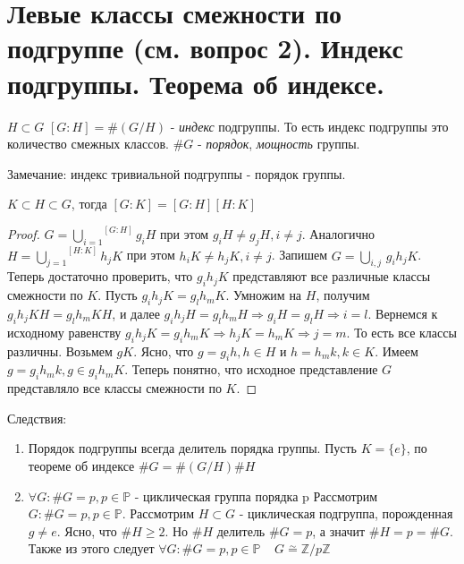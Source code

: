 \section{Левые классы смежности по подгруппе (см. вопрос 2). Индекс подгруппы. Теорема об индексе.}

\begin{defn}
  $ H \subset G $ \newline
  $ [G:H] = \#(G/H) $ - \emph{индекс} подгруппы. То есть индекс подгруппы это количество смежных классов. \newline
  $ \#G $ - \emph{порядок}, \emph{мощность} группы. 
\end{defn}

Замечание: индекс тривиальной подгруппы - порядок группы.

\begin{thm}
  $ K \subset H \subset G $, \newline тогда $ [G:K] = [G:H][H:K] $
\end{thm}
\begin{proof}
  $ G = \overset{[G:H]}{\underset{i=1}{\bigcup}} g_{i}H $ при этом $ g_{i}H \ne g_{j}H, i \ne j $. 
  Аналогично $ H = \overset{[H:K]}{\underset{j=1}\bigcup} h_{j}K $ при этом $ h_{i}K \ne h_{j}K, i \ne j $. 
  Запишем $ G = \underset{i, j}\bigcup \, g_{i}h_{j}K $. \newline
  Теперь достаточно проверить, что $ g_{i}h_{j}K $ представляют все различные классы смежности по $ K $.
  Пусть $ g_{i}h_{j}K = g_{l}h_{m}K $. Умножим на $ H $, получим $ g_{i}h_{j}KH = g_{l}h_{m}KH $, и далее
  $ g_{i}h_{j}H = g_{l}h_{m}H \Rightarrow  g_{i}H = g_{l}H \Rightarrow i = l $. Вернемся к исходному равенству
  $ g_{i}h_{j}K = g_{i}h_{m}K \Rightarrow h_{j}K = h_{m}K \Rightarrow j = m $. То есть все классы различны. \newline
  Возьмем $ gK $. Ясно, что $ g = g_{i}h, h \in H $ и $ h = h_{m}k, k \in K $. Имеем 
  $ g = g_{i}h_{m}k, g \in g_{i}h_{m}K $. Теперь понятно, что исходное представление $ G $ представляло все классы
  смежности по $ K $.
\end{proof}

Следствия:

\begin{enumerate}
  \item Порядок подгруппы всегда делитель порядка группы. \newline
    Пусть $ K = \{e\} $, по теореме об индексе $ \#G = \#(G/H)\#H $
  \item $ \forall G : \#G = p, p \in \mathbb{P} $ - циклическая группа порядка p \newline
    Рассмотрим $ G : \#G = p, p \in \mathbb{P} $. Рассмотрим $ H \subset G $ - циклическая подгруппа,
    порожденная $ g \ne e $. Ясно, что $ \#H \ge 2 $. Но $ \#H $ делитель $ \#G = p $, а значит
    $ \#H = p = \# G $. Также из этого следует $ \forall G : \#G = p, p \in \mathbb{P} \;\;\;\; 
    G \overset\sim{=} \mathbb{Z}/p\mathbb{Z} $
\end{enumerate}
